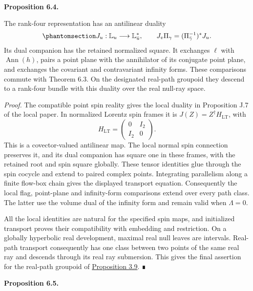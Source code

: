 \documentclass[
  english,
  11pt,
  reqno]{amsart}
\makeatletter
\newcommand{\pandocstatementheading}[1]{%
  \par\addpenalty{\@beginparpenalty}%
  \addvspace{.5\baselineskip plus .2\baselineskip minus .2\baselineskip}%
  {\normalfont\bfseries #1\par}%
  \nobreak\@afterindenttrue\@afterheading
}
\makeatother
\begin{document}
\pandocstatementheading{\protect{}\label{prop:global-projective-lorentz-duality}Proposition 6.4.}

The rank-four representation has an antilinear duality
\begin{equation}\protect\phantomsection\label{eq:global-local-twistor-real-duality}{
J_u:\mathbb L_u\longrightarrow\mathbb L_{\bar u}^*,
\qquad
J_v\Pi_\gamma=(\Pi_{\bar\gamma}^{-1})^*J_u.
}\end{equation} Its dual companion has the retained normalized square.
It exchanges \(\ell\) with \(\operatorname{Ann}(h)\), pairs a point
plane with the annihilator of its conjugate point plane, and exchanges
the covariant and contravariant infinity forms. These comparisons
commute with Theorem 6.3. On the designated real-path groupoid they
descend to a rank-four bundle with this duality over the real null-ray
space.

\emph{Proof.} The compatible point spin reality gives the local duality
in Proposition J.7 of the local paper. In normalized Lorentz spin frames
it is \(J(Z)=Z^\dagger H_{\mathrm{LT}}\), with \[
H_{\mathrm{LT}}=\begin{pmatrix}0&I_2\\I_2&0\end{pmatrix}.
\] This is a covector-valued antilinear map. The local normal spin
connection preserves it, and its dual companion has square one in these
frames, with the retained root and spin square globally. These tensor
identities glue through the spin cocycle and extend to paired complex
points. Integrating parallelism along a finite flow-box chain gives the
displayed transport equation. Consequently the local flag, point-plane
and infinity-form comparisons extend over every path class. The latter
use the volume dual of the infinity form and remain valid when
\(\Lambda=0\).

All the local identities are natural for the specified spin maps, and
initialized transport proves their compatibility with embedding and
restriction. On a globally hyperbolic real development, maximal real
null leaves are intervals. Real-path transport consequently has one
class between two points of the same real ray and descends through its
real ray submersion. This gives the final assertion for the real-path
groupoid of \hyperref[prop:real-path-groupoid-v08]{Proposition 3.9}. ∎

\pandocstatementheading{\protect{}\label{prop:operator-monodromy-lorentz-reality}Proposition 6.5.}
\end{document}
